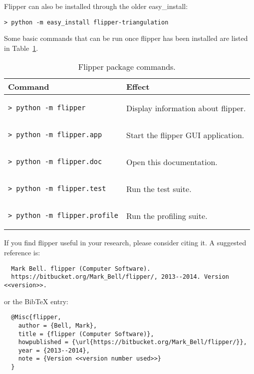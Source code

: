\documentclass[a4paper]{article}
\begin{document}
Flipper can also be installed through the older easy\_install:
\begin{lstlisting}
> python -m easy_install flipper-triangulation
\end{lstlisting}

Some basic commands that can be run once flipper has been installed are listed in Table~\ref{tbl:package_commands}.

\begin{table}[ht]
\label{tbl:package_commands}
\begin{center}
\begin{tabular}{l|l}
Command & Effect \\
\hline
\begin{lstlisting}
> python -m flipper
\end{lstlisting} & Display information about flipper. \\

\begin{lstlisting}
> python -m flipper.app
\end{lstlisting} & Start the flipper GUI application. \\

\begin{lstlisting}
> python -m flipper.doc
\end{lstlisting} & Open this documentation. \\

\begin{lstlisting}
> python -m flipper.test
\end{lstlisting} & Run the test suite. \\

\begin{lstlisting}
> python -m flipper.profile
\end{lstlisting} & Run the profiling suite. \\
\end{tabular}
\end{center}
\caption{Flipper package commands.}
\end{table}

If you find flipper useful in your research, please consider citing it. A suggested reference is:
\begin{verbatim}
  Mark Bell. flipper (Computer Software).
  https://bitbucket.org/Mark_Bell/flipper/, 2013--2014. Version <<version>>.
\end{verbatim}
or the BibTeX entry:
\begin{verbatim}
  @Misc{flipper,
    author = {Bell, Mark},
    title = {flipper (Computer Software)},
    howpublished = {\url{https://bitbucket.org/Mark_Bell/flipper/}},
    year = {2013--2014},
    note = {Version <<version number used>>}
  }
\end{verbatim}
\end{document}
